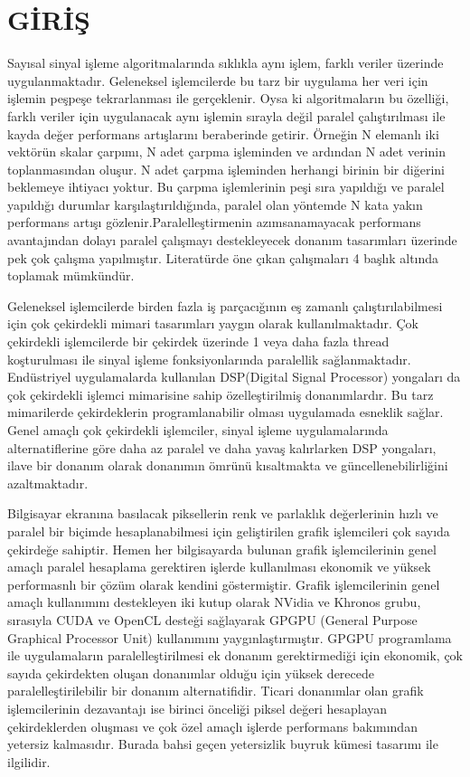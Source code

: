\chapter{G\.{I}R\.{I}\c{S}}
Sayısal sinyal işleme algoritmalarında sıklıkla aynı işlem, farklı veriler üzerinde uygulanmaktadır. Geleneksel işlemcilerde bu tarz bir uygulama her veri için işlemin peşpeşe tekrarlanması ile gerçeklenir. Oysa ki algoritmaların bu özelliği, farklı veriler için uygulanacak aynı işlemin sırayla değil paralel çalıştırılması ile kayda değer performans artışlarını beraberinde getirir. Örneğin N elemanlı iki vektörün skalar çarpımı, N adet çarpma işleminden ve ardından N adet verinin toplanmasından oluşur. N adet çarpma işleminden herhangi birinin bir diğerini beklemeye ihtiyacı yoktur. Bu çarpma işlemlerinin peşi sıra yapıldığı ve paralel yapıldığı durumlar karşılaştırıldığında, paralel olan yöntemde N kata yakın performans artışı gözlenir.Paralelleştirmenin azımsanamayacak performans avantajından dolayı paralel çalışmayı destekleyecek donanım tasarımları üzerinde pek çok çalışma yapılmıştır. Literatürde öne çıkan çalışmaları 4 başlık altında toplamak mümkündür.  \par

Geleneksel işlemcilerde birden fazla iş parçacığının eş zamanlı çalıştırılabilmesi için çok çekirdekli mimari tasarımları yaygın olarak kullanılmaktadır. Çok çekirdekli işlemcilerde bir çekirdek üzerinde 1 veya daha fazla thread koşturulması ile sinyal işleme fonksiyonlarında paralellik sağlanmaktadır. Endüstriyel uygulamalarda kullanılan DSP(Digital Signal Processor) yongaları da çok çekirdekli işlemci mimarisine sahip özelleştirilmiş donanımlardır.\cite{dspArchitectures} Bu tarz mimarilerde çekirdeklerin programlanabilir olması uygulamada esneklik sağlar. Genel amaçlı çok çekirdekli işlemciler, sinyal işleme uygulamalarında alternatiflerine göre daha az paralel ve daha yavaş kalırlarken DSP yongaları, ilave bir donanım olarak donanımın ömrünü kısaltmakta ve güncellenebilirliğini azaltmaktadır.\cite{hallmans2013gpgpu} \par

Bilgisayar ekranına basılacak piksellerin renk ve parlaklık değerlerinin hızlı ve paralel bir biçimde hesaplanabilmesi için geliştirilen grafik işlemcileri çok sayıda çekirdeğe sahiptir.\cite{Kilgariff2005} Hemen her bilgisayarda bulunan grafik işlemcilerinin genel amaçlı paralel hesaplama gerektiren işlerde kullanılması ekonomik ve yüksek performasnlı bir çözüm olarak kendini göstermiştir. Grafik işlemcilerinin genel amaçlı kullanımını destekleyen iki kutup olarak NVidia ve Khronos grubu, sırasıyla CUDA ve OpenCL desteği sağlayarak GPGPU (General Purpose Graphical Processor Unit) kullanımını yaygınlaştırmıştır. \cite{kirk2007nvidia} \cite{stone2010opencl} GPGPU programlama ile uygulamaların paralelleştirilmesi ek donanım gerektirmediği için ekonomik, çok sayıda çekirdekten oluşan donanımlar olduğu için yüksek derecede paralelleştirilebilir bir donanım alternatifidir. Ticari donanımlar olan grafik işlemcilerinin dezavantajı ise birinci önceliği piksel değeri hesaplayan çekirdeklerden oluşması ve çok özel amaçlı işlerde performans bakımından yetersiz kalmasıdır. Burada bahsi geçen yetersizlik buyruk kümesi tasarımı ile ilgilidir.\par

